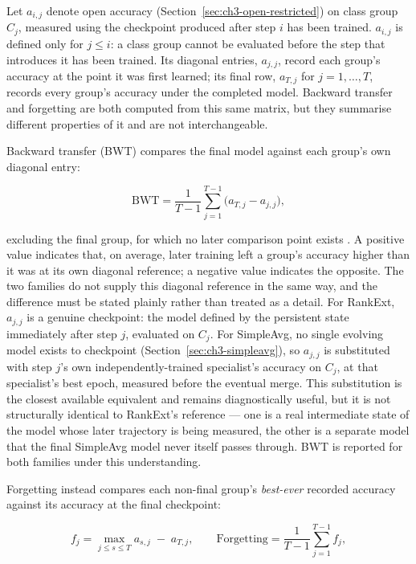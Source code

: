 Let $a_{i,j}$ denote open accuracy (Section~\ref{sec:ch3-open-restricted}) on class group $C_j$,
measured using the checkpoint produced after step $i$ has been trained.
$a_{i,j}$ is defined only for $j\le i$: a class group cannot be evaluated
before the step that introduces it has been trained. Its diagonal entries,
$a_{j,j}$, record each group's accuracy at the point it was first learned;
its final row, $a_{T,j}$ for $j=1,\dots,T$, records every group's accuracy
under the completed model. Backward transfer and forgetting are both computed from
this same matrix, but they summarise different properties of it and are
not interchangeable.

Backward transfer (BWT) compares the final model against each group's own
diagonal entry:

\begin{equation}
\label{eq:ch3-bwt}
\text{BWT} = \frac{1}{T-1}\sum_{j=1}^{T-1}\big(a_{T,j} - a_{j,j}\big),
\end{equation}

excluding the final group, for which no later comparison point exists
\parencite{lopezpaz2017gradient}. A positive value indicates that, on average,
later training left a group's accuracy higher than it was at its own
diagonal reference; a negative value indicates the opposite. The two
families do not supply this diagonal reference in the same way, and the
difference must be stated plainly rather than treated as a detail. For
RankExt, $a_{j,j}$ is a genuine checkpoint: the model defined by the
persistent state immediately after step $j$, evaluated on $C_j$. For SimpleAvg,
no single evolving model exists to checkpoint (Section~\ref{sec:ch3-simpleavg}), so
$a_{j,j}$ is substituted with step $j$'s own independently-trained
specialist's accuracy on $C_j$, at that specialist's best epoch, measured
before the eventual merge. This substitution is the closest available
equivalent and remains diagnostically useful, but it is not structurally
identical to RankExt's reference --- one is a real intermediate state of the
model whose later trajectory is being measured, the other is a separate
model that the final SimpleAvg model never itself passes through. BWT is
reported for both families under this understanding.

Forgetting instead compares each non-final group's \emph{best-ever} recorded
accuracy against its accuracy at the final checkpoint:

\begin{equation}
\label{eq:ch3-forgetting}
f_j = \max_{j\le s\le T} a_{s,j} \;-\; a_{T,j}, \qquad
\text{Forgetting} = \frac{1}{T-1}\sum_{j=1}^{T-1} f_j,
\end{equation}

